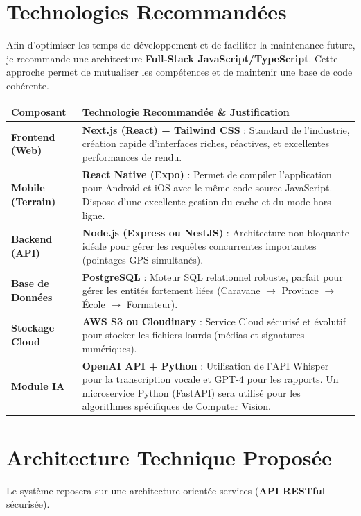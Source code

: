 \documentclass[12pt,a4paper]{article}
\begin{document}
\section{Technologies Recommandées}
Afin d'optimiser les temps de développement et de faciliter la maintenance future, je recommande une architecture \textbf{Full-Stack JavaScript/TypeScript}. Cette approche permet de mutualiser les compétences et de maintenir une base de code cohérente.

\begin{table}[h]
\centering
\renewcommand{\arraystretch}{1.5}
\begin{tabularx}{\textwidth}{@{} l X @{}}
\toprule
\textbf{Composant} & \textbf{Technologie Recommandée \& Justification} \\
\midrule
\textbf{Frontend (Web)} & \textbf{Next.js (React) + Tailwind CSS} : Standard de l'industrie, création rapide d'interfaces riches, réactives, et excellentes performances de rendu. \\
\textbf{Mobile (Terrain)} & \textbf{React Native (Expo)} : Permet de compiler l'application pour Android et iOS avec le même code source JavaScript. Dispose d'une excellente gestion du cache et du mode hors-ligne. \\
\textbf{Backend (API)} & \textbf{Node.js (Express ou NestJS)} : Architecture non-bloquante idéale pour gérer les requêtes concurrentes importantes (pointages GPS simultanés). \\
\textbf{Base de Données} & \textbf{PostgreSQL} : Moteur SQL relationnel robuste, parfait pour gérer les entités fortement liées (Caravane $\rightarrow$ Province $\rightarrow$ École $\rightarrow$ Formateur). \\
\textbf{Stockage Cloud} & \textbf{AWS S3 ou Cloudinary} : Service Cloud sécurisé et évolutif pour stocker les fichiers lourds (médias et signatures numériques). \\
\textbf{Module IA} & \textbf{OpenAI API + Python} : Utilisation de l'API Whisper pour la transcription vocale et GPT-4 pour les rapports. Un microservice Python (FastAPI) sera utilisé pour les algorithmes spécifiques de Computer Vision. \\
\bottomrule
\end{tabularx}
\end{table}

\section{Architecture Technique Proposée}
Le système reposera sur une architecture orientée services (\textbf{API RESTful} sécurisée).
\end{document}
